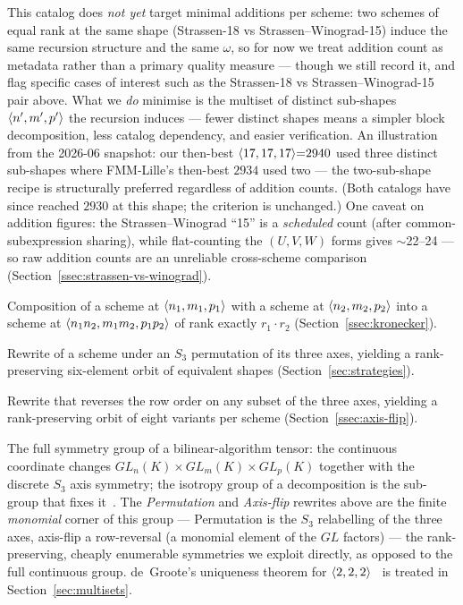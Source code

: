 \begin{description}[itemsep=4pt, leftmargin=2em]
  \item[Optimisation target.] This catalog does \emph{not yet} target
    minimal additions per scheme: two schemes of equal rank at the
    same shape (Strassen-18 vs Strassen--Winograd-15) induce the same
    recursion structure and the same \(\omega\), so for now we treat
    addition count as metadata rather than a primary quality measure ---
    though we still record it, and flag specific cases of interest such
    as the Strassen-18 vs Strassen--Winograd-15 pair above. What we \emph{do} minimise is
    the multiset of distinct sub-shapes \(\langle n', m', p' \rangle\) the
    recursion induces --- fewer distinct shapes means a simpler block
    decomposition, less catalog dependency, and easier verification.
    An illustration from the 2026-06 snapshot: our then-best
    \(\langle 17, 17, 17 \rangle{=}2940\) used three distinct sub-shapes
    where FMM-Lille's then-best \(2934\) used two --- the two-sub-shape
    recipe is structurally preferred regardless of addition counts.
    (Both catalogs have since reached \(2930\) at this shape; the
    criterion is unchanged.) One caveat on addition figures: the
    Strassen--Winograd ``15'' is a \emph{scheduled} count (after
    common-subexpression sharing), while flat-counting the \((U, V,
    W)\) forms gives \(\sim\)22--24 --- so raw addition counts are an
    unreliable cross-scheme comparison
    (Section~\ref{ssec:strassen-vs-winograd}).

  \item[Kronecker product.] Composition of a scheme at
    \(\langle n_1, m_1, p_1 \rangle\) with a scheme at
    \(\langle n_2, m_2, p_2 \rangle\) into a scheme at
    \(\langle n_1 n_2, m_1 m_2, p_1 p_2 \rangle\) of rank exactly
    \(r_1 \cdot r_2\) (Section~\ref{ssec:kronecker}).

  \item[Permutation.] Rewrite of a scheme under an \(S_3\)
    permutation of its three axes, yielding a rank-preserving
    six-element orbit of equivalent shapes
    (Section~\ref{sec:strategies}).

  \item[Axis-flip.] Rewrite that reverses the row order on any
    subset of the three axes, yielding a rank-preserving orbit of
    eight variants per scheme (Section~\ref{ssec:axis-flip}).

  \item[Isotropy + coordinate change.] The full symmetry group of a
    bilinear-algorithm tensor: the continuous coordinate changes
    \(GL_n(K) \times GL_m(K) \times GL_p(K)\) together with the discrete
    \(S_3\) axis symmetry; the isotropy group of a decomposition is the
    sub-group that fixes it~\cite{burichenko2014}. The \emph{Permutation}
    and \emph{Axis-flip} rewrites above are the finite \emph{monomial}
    corner of this group --- Permutation is the \(S_3\) relabelling of
    the three axes, axis-flip a row-reversal (a monomial element of the
    \(GL\) factors) --- the rank-preserving, cheaply enumerable
    symmetries we exploit directly, as opposed to the full continuous
    group. de~Groote's uniqueness theorem for
    \(\langle 2, 2, 2 \rangle\)~\cite{degroote1978} is treated in
    Section~\ref{sec:multisets}.


\end{description}
